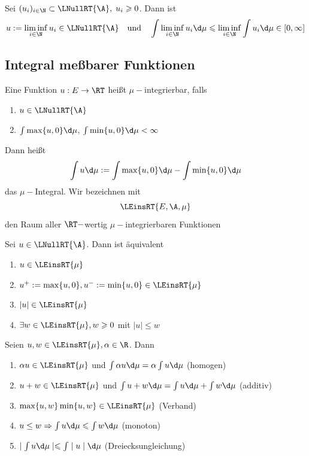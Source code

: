 \documentclass[11pt, a4paper]{article}
\begin{document}
\begin{lemma} Sei $(u_i)_{i\in \N} \subset \LNullRT{\A}, \; u_i \geqslant 0$. Dann ist 
$$u:= \liminf_{i\in\N} u_i \in \LNullRT{\A} \quad \text{und}\quad \int \liminf_{i\in\N} u_i \d\mu \leqslant \liminf_{i\in\N}  \int u_i \d\mu \in [0,\infty]$$
\end{lemma}


\subsection{Integral meßbarer Funktionen}

\begin{definition}
    Eine Funktion $u:E\to \RT$ heißt $\mu-$integrierbar, falls 
    \begin{enumerate}
        \item $u\in \LNullRT{\A}$
        \item $\int \max\{u,0\}\d\mu$, $\int \min\{u,0\}\d\mu <\infty $
    \end{enumerate}
    Dann heißt $$\int u \d\mu := \int \max\{u,0\}\d\mu -\int \min\{u,0\}\d\mu$$ das $\mu-$Integral. Wir bezeichnen mit 
    $$\LEinsRT{E,\A,\mu}$$
    den Raum aller $\RT-$wertig $\mu-$integrierbaren Funktionen
    
\end{definition}

\begin{theorem}
Sei $u\in \LNullRT{\A}$. Dann ist äquivalent
\begin{enumerate}[label=\alph*)]
    \item $u\in\LEinsRT{\mu}$
    \item $u^+:= \max\{u,0\}, u^-:= \min\{u,0\} \in \LEinsRT{\mu}$
    \item $|u| \in \LEinsRT{\mu}$
    \item $\exists w\in \LEinsRT{\mu}, w\geqslant 0$ mit $|u|\leqslant w$
\end{enumerate}
    
\end{theorem}

\begin{corollary} Seien $u,w\in \LEinsRT{\mu}, \alpha \in \R$. Dann
\begin{enumerate}
    \item $\alpha u \in \LEinsRT{\mu}$ und $\int \alpha u \d\mu = \alpha\int u \d\mu$ (homogen)
    \item $u+w\in \LEinsRT{\mu}$ und $\int u+w \d\mu = \int u \d\mu +\int w \d\mu$ (additiv)
    \item $\max\{u,w\} \min\{u,w\}\in \LEinsRT{\mu}$ (Verband)
    \item $u\leq w \Rightarrow \int u\d\mu \leqslant \int w\d\mu$ (monoton)
    \item $\mid \int u \d\mu \mid \leqslant \int \mid u\mid \d\mu $ (Dreiecksungleichung)
\end{enumerate}
\end{corollary}
\end{document}

